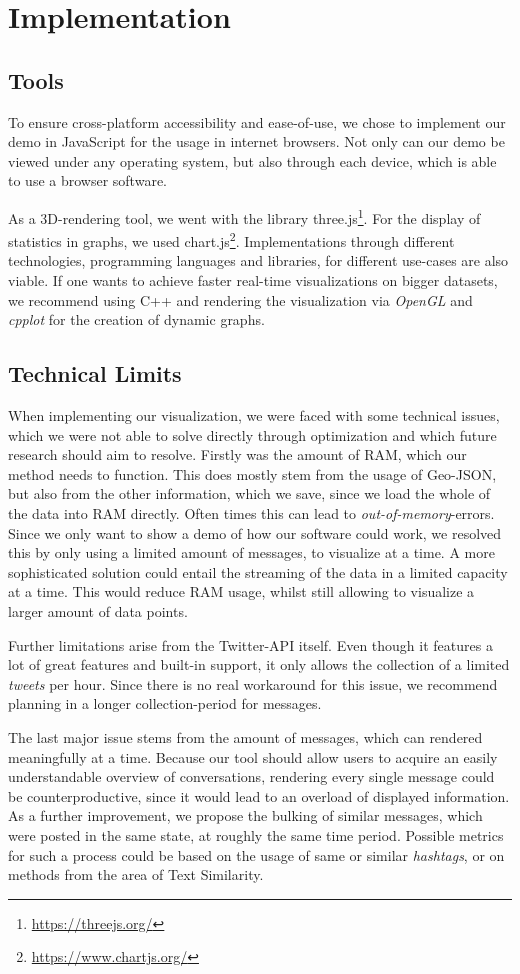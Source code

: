 \chapter{Implementation}
\label{imp}
\section{Tools}
To ensure cross-platform accessibility and ease-of-use, we chose to implement our demo in JavaScript for the usage in internet browsers. Not only can our demo be viewed under any operating system, but also through each device, which is able to use a browser software.

As a 3D-rendering tool, we went with the library three.js\footnote{\url{https://threejs.org/}}. For the display of statistics in graphs, we used chart.js\footnote{\url{https://www.chartjs.org/}}. Implementations through different technologies, programming languages and libraries, for different use-cases are also viable. If one wants to achieve faster real-time visualizations on bigger datasets, we recommend using C++ and rendering the visualization via \textit{OpenGL} and \textit{cpplot} for the creation of dynamic graphs.
\section{Technical Limits}
When implementing our visualization, we were faced with some technical issues, which we were not able to solve directly through optimization and which future research should aim to resolve. Firstly was the amount of RAM, which our method needs to function. This does mostly stem from the usage of Geo-JSON, but also from the other information, which we save, since we load the whole of the data into RAM directly. Often times this can lead to \emph{out-of-memory}-errors. Since we only want to show a demo of how our software could work, we resolved this by only using a limited amount of messages, to visualize at a time. A more sophisticated solution could entail the streaming of the data in a limited capacity at a time. This would reduce RAM usage, whilst still allowing to visualize a larger amount of data points. 

Further limitations arise from the Twitter-API itself. Even though it features a lot of great features and built-in support, it only allows the collection of a limited \emph{tweets} per hour. Since there is no real workaround for this issue, we recommend planning in a longer collection-period for messages.

The last major issue stems from the amount of messages, which can rendered meaningfully at a time. Because our tool should allow users to acquire an easily understandable overview of conversations, rendering every single message could be counterproductive, since it would lead to an overload of displayed information. As a further improvement, we propose the bulking of similar messages, which were posted in the same state, at roughly the same time period. Possible metrics for such a process could be based on the usage of same or similar \emph{hashtags}, or on methods from the area of Text Similarity.
